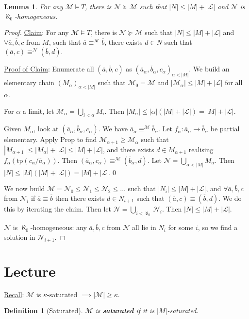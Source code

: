 \documentclass[]{article}
\theoremstyle{custhm}
\theoremstyle{cusdef}
\newtheorem{defin}[theorem]{Definition}
\theoremstyle{custhm}
\newtheorem{lemma}[theorem]{Lemma}
\theoremstyle{custhm}
\theoremstyle{custhm}
\theoremstyle{ex}
\theoremstyle{custhm}
\theoremstyle{cusdef}
\theoremstyle{remark}
\theoremstyle{remark}
\theoremstyle{numremark}
\newcommand{\ra}{\rightarrow}
\newcommand{\undf}[1]{\textit{\textbf{#1}}}
\renewcommand{\L}{\mathcal{L}}
\newcommand{\M}{\mathcal{M}}
\renewcommand{\bar}{\overline}
\newcommand{\tp}{\textrm{tp}}
\newcommand{\N}{\mathcal{N}}
\begin{document}
\begin{lemma}
For any $\M\models T$, there is $\N\succeq\M$ such that $|N|\le |M| + |\L|$ and $\N$ is $\aleph_0$-homogeneous.
\end{lemma}
\begin{proof}
\underline{Claim}: For any $\M\models T$, there is $\N\succeq \M$ such that $|N|\le |M|+|\L|$ and $\forall \bar{a},\bar{b},c$ from $M$, such that $\bar{a}\equiv^\M\bar{b}$, there exists $d\in N$ such that $(\bar{a},c) \equiv^\N(\bar{b},d)$.

\underline{Proof of Claim}: Enumerate all $(\bar{a},\bar{b},c)$ as $(\bar{a}_\alpha,\bar{b}_\alpha,c_\alpha)_{\alpha < |M|}$. We build an elementary chain $(M_\alpha)_{\alpha < |M|}$ such that $\M_0 = \M$ and $|\M_\alpha| \le |M| + |\L|$ for all $\alpha$.

For $\alpha$ a limit, let $\M_\alpha = \bigcup_{i<\alpha}M_i$. Then $|M_\alpha| \le |\alpha|(|M|+|\L|) = |M| + |\L|$.

Given $M_\alpha$, look at $(\bar{a}_\alpha,\bar{b}_\alpha,c_\alpha)$. We have $\bar{a}_\alpha \equiv^\M\bar{b}_\alpha$. Let $f_\alpha : \bar{a}_\alpha \ra \bar{b}_\alpha$ be partial elementary. Apply Prop to find $\M_{\alpha+1} \ge \M_\alpha$ such that $|M_{\alpha+1}|\le |M_\alpha| + |\L| \le |M| + |\L|$, and there exists $d \in M_{\alpha+1}$ realising $f_\alpha(\tp(c_\alpha/\bar{a}_\alpha))$. Then $(\bar{a}_\alpha,c_\alpha) \equiv^\M(\bar{b}_\alpha,d)$. Let $\N = \bigcup_{\alpha < |M|}M_\alpha$. Then $|N| \le |M|(|M|+|\L|) = |M| + |\L|$.\qed

We now build $\M = \N_0 \le \N_1\le \N_2\le \dots$ such that $|N_i| \le |M|+|\L|$, and $\forall \bar{a},\bar{b},c$ from $\N_i$ if $\bar{a}\equiv \bar{b}$ then there exists $d\in N_{i+1}$ such that $(\bar{a},c) \equiv (\bar{b},d)$. We do this by iterating the claim. Then let $\N = \bigcup_{i<\aleph_0}\N_i$. Then $|N|\le |M| + |\L|$.

$\N$ is $\aleph_0$-homogeneous: any $\bar{a},\bar{b},c$ from $\N$ all lie in $N_i$ for some $i$, so we find a solution in $\N_{i+1}$.
\end{proof}

\section{Lecture}
\underline{Recall}: $\M$ is $\kappa$-saturated $\implies |\M| \ge \kappa$.

\begin{defin}[Saturated]
$\M$ is \undf{saturated} if it is $|M|$-saturated.
\end{defin}
\end{document}
